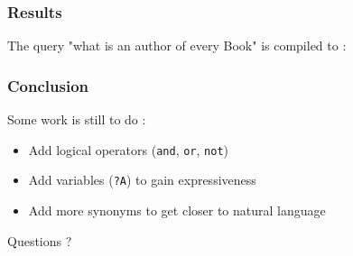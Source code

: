 \documentclass{beamer}
\begin{document}
  \begin{frame}
    \frametitle{Results}
    The query "what is an author of every Book" is compiled to :\\
    \lstI
  \end{frame}
  \begin{frame}
    \frametitle{Conclusion}
    Some work is still to do :
    \begin{itemize}
      \item Add logical operators (\texttt{and}, \texttt{or}, \texttt{not})
      \item Add variables (\texttt{?A}) to gain expressiveness
      \item Add more synonyms to get closer to natural language
    \end{itemize}

  \end{frame}
\begin{frame}
  \centering
  Questions ?
\end{frame}
\end{document}
